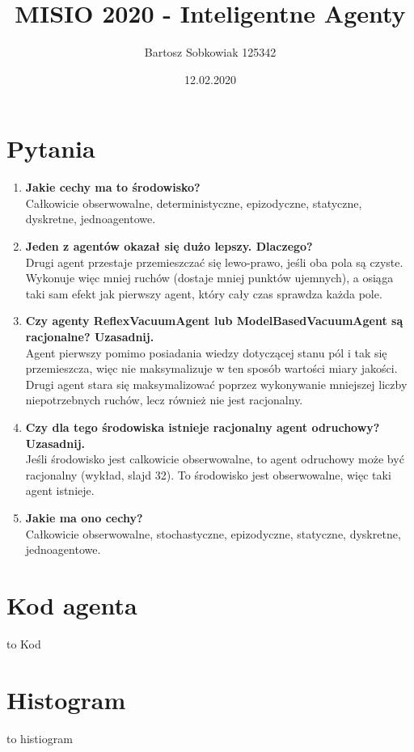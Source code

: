 \documentclass{article}
\title{MISIO 2020 - Inteligentne Agenty}
\author{Bartosz Sobkowiak 125342}
\date{12.02.2020}
\begin{document}
\maketitle


\section{Pytania}
\begin{enumerate}
    \item \textbf{Jakie cechy ma to środowisko?} \\
    Całkowicie obserwowalne, deterministyczne, epizodyczne, statyczne, dyskretne, jednoagentowe.
    
    \item \textbf{Jeden z agentów okazał się dużo lepszy. Dlaczego?} \\
    Drugi agent przestaje przemieszczać się lewo-prawo, jeśli oba pola są czyste. Wykonuje więc mniej ruchów (dostaje mniej punktów ujemnych), a osiąga taki sam efekt jak pierwszy agent, który cały czas sprawdza każda pole.
    
    \item \textbf{Czy agenty ReflexVacuumAgent lub ModelBasedVacuumAgent są racjonalne? Uzasadnij.} \\ 
    Agent pierwszy pomimo posiadania wiedzy dotyczącej stanu pól i tak się przemieszcza, więc nie maksymalizuje w ten sposób wartości miary jakości. Drugi agent stara się maksymalizować poprzez wykonywanie mniejszej liczby niepotrzebnych ruchów, lecz również nie jest racjonalny.
    
    \item \textbf{Czy dla tego środowiska istnieje racjonalny agent odruchowy? Uzasadnij.} \\
    Jeśli środowisko jest calkowicie obserwowalne, to agent odruchowy może być racjonalny (wykład, slajd 32). To środowisko jest obserwowalne, więc taki agent istnieje.
    
    \item \textbf{Jakie ma ono cechy?} \\
	Całkowicie obserwowalne, stochastyczne, epizodyczne, statyczne, dyskretne, jednoagentowe.

\end{enumerate}

\section{Kod agenta}
to Kod

\section{Histogram}
to histiogram
\end{document}
